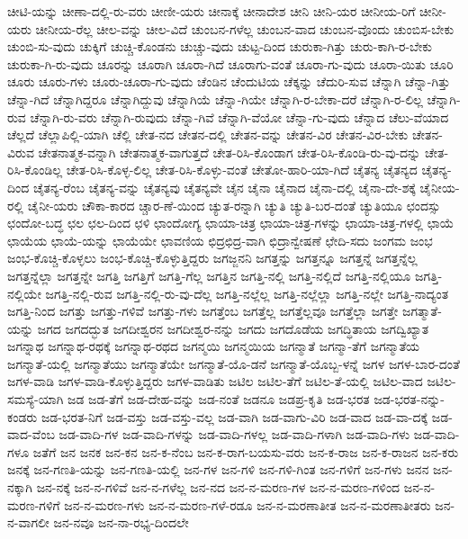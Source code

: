 {ಚೀಟಿ-ಯನ್ನು
ಚೀಣಾ-ದಲ್ಲಿ-ರು-ವರು
ಚೀಣೀ-ಯರು
ಚೀನಾಕ್ಕೆ
ಚೀನಾದೇಶ
ಚೀನಿ
ಚೀನಿ-ಯರ
ಚೀನೀಯ-ರಿಗೆ
ಚೀನೀ-ಯರು
ಚೀನೀಯ-ರೆಲ್ಲ
ಚೀಲ-ವನ್ನು
ಚೀಲ-ವಿದೆ
ಚುಂಬನ-ಗಳೆಲ್ಲ
ಚುಂಬನ-ವಾದ
ಚುಂಬನ-ವೊಂದು
ಚುಂಬಿಸ-ಬೇಕು
ಚುಂಬಿ-ಸು-ವುದು
ಚುಕ್ಕಿಗೆ
ಚುಚ್ಚಿ-ಕೊಂಡನು
ಚುಚ್ಚು-ವುದು
ಚುಟ್ಟ-ದಿಂದ
ಚುರುಕಾ-ಗಿತ್ತು
ಚುರು-ಕಾಗಿ-ರ-ಬೇಕು
ಚುರುಕಾ-ಗಿ-ರು-ವುದು
ಚೂರನ್ನು
ಚೂರಾಗಿ
ಚೂರಾ-ಗಿದೆ
ಚೂರಾಗು-ವಂತೆ
ಚೂರಾ-ಗು-ವುದು
ಚೂರಾ-ಯಿತು
ಚೂರಿ
ಚೂರು
ಚೂರು-ಗಳು
ಚೂರು-ಚೂರಾ-ಗು-ವುದು
ಚೆಂಡಿನ
ಚೆಂದುಟಿಯ
ಚೆಕ್ಕನ್ನು
ಚೆದುರಿ-ಸುವ
ಚೆನ್ನಾಗಿ
ಚೆನ್ನಾ-ಗಿತ್ತು
ಚೆನ್ನಾ-ಗಿದೆ
ಚೆನ್ನಾಗಿದ್ದರೂ
ಚೆನ್ನಾಗಿದ್ದುವು
ಚೆನ್ನಾಗಿಯೆ
ಚೆನ್ನಾ-ಗಿಯೇ
ಚೆನ್ನಾಗಿ-ರ-ಬೇಕಾ-ದರೆ
ಚೆನ್ನಾಗಿ-ರ-ಲಿಲ್ಲ
ಚೆನ್ನಾಗಿ-ರುವ
ಚೆನ್ನಾಗಿ-ರು-ವರು
ಚೆನ್ನಾಗಿ-ರುವುದು
ಚೆನ್ನಾ-ಗಿವೆ
ಚೆನ್ನಾಗಿ-ವೆಯೋ
ಚೆನ್ನಾ-ಗು-ವುದು
ಚೆನ್ನಾದ
ಚೆಲು-ವೆಯಾದ
ಚೆಲ್ಲದೆ
ಚೆಲ್ಲಾಪಿಲ್ಲಿ-ಯಾಗಿ
ಚೆಲ್ಲಿ
ಚೇತ-ನದ
ಚೇತನ-ದಲ್ಲಿ
ಚೇತನ-ವನ್ನು
ಚೇತನ-ವಿರ
ಚೇತನ-ವಿರ-ಬೇಕು
ಚೇತನ-ವಿರುವ
ಚೇತನಾತ್ಮಕ-ವನ್ನಾಗಿ
ಚೇತನಾತ್ಮಕ-ವಾಗುತ್ತದೆ
ಚೇತ-ರಿಸಿ-ಕೊಂಡಾಗ
ಚೇತ-ರಿಸಿ-ಕೊಂಡಿ-ರು-ವು-ದನ್ನು
ಚೇತ-ರಿಸಿ-ಕೊಂಡಿಲ್ಲ
ಚೇತ-ರಿಸಿ-ಕೊಳ್ಳ-ಲಿಲ್ಲ
ಚೇತ-ರಿಸಿ-ಕೊಳ್ಳು-ವಂತೆ
ಚೇತೋ-ಹಾರಿ-ಯಾ-ಗಿದೆ
ಚೈತನ್ಯ
ಚೈತನ್ಯದ
ಚೈತನ್ಯ-ದಿಂದ
ಚೈತನ್ಯ-ರೆಂಬ
ಚೈತನ್ಯ-ವನ್ನು
ಚೈತನ್ಯವು
ಚೈತನ್ಯವೇ
ಚೈನ
ಚೈನಾ
ಚೈನಾದ
ಚೈನಾ-ದಲ್ಲಿ
ಚೈನಾ-ದೇ-ಶಕ್ಕೆ
ಚೈನೀಯ-ರಲ್ಲಿ
ಚೈನೀ-ಯರು
ಚೌಕಾ-ಕಾರದ
ಚ್ಚಾರ-ಣೆ-ಯಿಂದ
ಚ್ಯುತ-ರನ್ನಾಗಿ
ಚ್ಯುತಿ
ಚ್ಯುತಿ-ಬರ-ದಂತೆ
ಚ್ಯುತಿಯೂ
ಛಂದಸ್ಸು
ಛಂದೋ-ಬದ್ಧ
ಛಲ
ಛಲ-ದಿಂದ
ಛಳಿ
ಛಾಂದೋಗ್ಯ
ಛಾಯಾ-ಚಿತ್ರ
ಛಾಯಾ-ಚಿತ್ರ-ಗಳನ್ನು
ಛಾಯಾ-ಚಿತ್ರ-ಗಳಲ್ಲಿ
ಛಾಯೆ
ಛಾಯೆಯ
ಛಾಯೆ-ಯನ್ನು
ಛಾಯೆಯೇ
ಛಾವಣಿಯ
ಛಿದ್ರಛಿದ್ರ-ವಾಗಿ
ಛಿದ್ರಾನ್ವೇಷಣೆ
ಛೇದಿ-ಸದು
ಜಂಗಮ
ಜಂಭ
ಜಂಭ-ಕೊಚ್ಚಿ-ಕೊಳ್ಳಲು
ಜಂಭ-ಕೊಚ್ಚಿ-ಕೊಳ್ಳುತ್ತಿದ್ದರು
ಜಗಜ್ಜನನಿ
ಜಗತ್ತನ್ನು
ಜಗತ್ತನ್ನೂ
ಜಗತ್ತನ್ನೆ
ಜಗತ್ತನ್ನೆಲ್ಲ
ಜಗತ್ತನ್ನೆಲ್ಲಾ
ಜಗತ್ತನ್ನೇ
ಜಗತ್ತಿ
ಜಗತ್ತಿಗೆ
ಜಗತ್ತಿ-ಗೆಲ್ಲ
ಜಗತ್ತಿನ
ಜಗತ್ತಿ-ನಲ್ಲಿ
ಜಗತ್ತಿ-ನಲ್ಲಿದೆ
ಜಗತ್ತಿ-ನಲ್ಲಿಯೂ
ಜಗತ್ತಿ-ನಲ್ಲಿಯೇ
ಜಗತ್ತಿ-ನಲ್ಲಿ-ರುವ
ಜಗತ್ತಿ-ನಲ್ಲಿ-ರು-ವು-ದೆಲ್ಲ
ಜಗತ್ತಿ-ನಲ್ಲೆಲ್ಲ
ಜಗತ್ತಿ-ನಲ್ಲೆಲ್ಲಾ
ಜಗತ್ತಿ-ನಲ್ಲೇ
ಜಗತ್ತಿ-ನಾದ್ಯಂತ
ಜಗತ್ತಿ-ನಿಂದ
ಜಗತ್ತು
ಜಗತ್ತು-ಗಳಿವೆ
ಜಗತ್ತು-ಗಳು
ಜಗತ್ತೆಂಬ
ಜಗತ್ತೆಲ್ಲ
ಜಗತ್ತೆಲ್ಲವೂ
ಜಗತ್ತೆಲ್ಲಾ
ಜಗತ್ತೇ
ಜಗತ್ಮಾತೆ-ಯನ್ನು
ಜಗದ
ಜಗದದ್ಭುತ
ಜಗದೀಶ್ವರನ
ಜಗದೀಶ್ವರ-ನನ್ನು
ಜಗದು
ಜಗದೊಡೆಯ
ಜಗದ್ಧಿತಾಯ
ಜಗದ್ವಿಖ್ಯಾತ
ಜಗನ್ನಾಥ
ಜಗನ್ನಾಥ-ರಥಕ್ಕೆ
ಜಗನ್ನಾಥ-ರಥದ
ಜಗನ್ಮಯಿ
ಜಗನ್ಮಯಿಯ
ಜಗನ್ಮಾತೆ
ಜಗನ್ಮಾ-ತೆಗೆ
ಜಗನ್ಮಾತೆಯ
ಜಗನ್ಮಾತೆ-ಯಲ್ಲಿ
ಜಗನ್ಮಾತೆಯು
ಜಗನ್ಮಾತೆಯೇ
ಜಗನ್ಮಾತೆ-ಯೊ-ಡನೆ
ಜಗನ್ಮಾತೆ-ಯೊಬ್ಬ-ಳನ್ನೆ
ಜಗಳ
ಜಗಳ-ಬಾರ-ದಂತೆ
ಜಗಳ-ವಾಡಿ
ಜಗಳ-ವಾಡಿ-ಕೊಳ್ಳುತ್ತಿದ್ದರು
ಜಗಳ-ವಾಡಿತು
ಜಟಿಲ
ಜಟಿಲ-ತೆಗೆ
ಜಟಿಲ-ತೆ-ಯಲ್ಲಿ
ಜಟಿಲ-ವಾದ
ಜಟಿಲ-ಸಮಸ್ಯೆ-ಯಾಗಿ
ಜಡ
ಜಡ-ತೆಗೆ
ಜಡ-ದೇಹ-ವನ್ನು
ಜಡ-ನಂತೆ
ಜಡನೂ
ಜಡಪ್ರ-ಕೃತಿ
ಜಡ-ಭರತ
ಜಡ-ಭರತ-ನನ್ನು-ಕಂಡರು
ಜಡ-ಭರತ-ನಿಗೆ
ಜಡ-ವಸ್ತು
ಜಡ-ವಸ್ತು-ವಲ್ಲ
ಜಡ-ವಾಗಿ
ಜಡ-ವಾಗು-ವಿರಿ
ಜಡ-ವಾದ
ಜಡ-ವಾ-ದಕ್ಕೆ
ಜಡ-ವಾದ-ವೆಂಬ
ಜಡ-ವಾದಿ-ಗಳ
ಜಡ-ವಾದಿ-ಗಳನ್ನು
ಜಡ-ವಾದಿ-ಗಳಲ್ಲ
ಜಡ-ವಾದಿ-ಗಳಾಗಿ
ಜಡ-ವಾದಿ-ಗಳು
ಜಡ-ವಾದಿ-ಗಳೂ
ಜತೆಗೆ
ಜನ
ಜನಕ
ಜನ-ಕನ
ಜನ-ಕ-ನೆಂಬ
ಜನ-ಕ-ರಾಗ-ಬಯಸು-ವರು
ಜನ-ಕ-ರಾಜ
ಜನ-ಕ-ರಾಜನ
ಜನ-ಕರು
ಜನಕ್ಕೆ
ಜನ-ಗಣತಿ-ಯನ್ನು
ಜನ-ಗಣತಿ-ಯಲ್ಲಿ
ಜನ-ಗಳ
ಜನ-ಗಳಿ
ಜನ-ಗಳಿ-ಗಿಂತ
ಜನ-ಗಳಿಗೆ
ಜನ-ಗಳು
ಜನನ
ಜನ-ನಕ್ಕಾಗಿ
ಜನ-ನಕ್ಕೆ
ಜನ-ನ-ಗಳಿವೆ
ಜನ-ನ-ಗಳೆಲ್ಲ
ಜನ-ನದ
ಜನ-ನ-ಮರಣ-ಗಳ
ಜನ-ನ-ಮರಣ-ಗಳಿಂದ
ಜನ-ನ-ಮರಣ-ಗಳಿಗೆ
ಜನ-ನ-ಮರಣ-ಗಳು
ಜನ-ನ-ಮರಣ-ಗಳೆ-ರಡೂ
ಜನ-ನ-ಮರಣಾತೀತ
ಜನ-ನ-ಮರಣಾತೀತರು
ಜನ-ನ-ವಾಗಲೀ
ಜನ-ನವೂ
ಜನ-ನಾ-ರಭ್ಯ-ದಿಂದಲೇ
}
